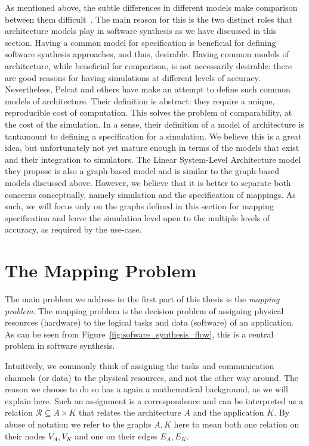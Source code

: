 As mentioned above, the subtle differences in different models make comparison between them difficult~\cite{goens_mcsoc16}.
The main reason for this is the two distinct roles that architecture models play in software synthesis as we have discussed in this section.
Having a common model for specification is beneficial for defining software synthesis approaches, and thus, desirable.
Having common models of architecture, while beneficial for comparison, is not necessarily desirable: there are good reasons for having simulations at different levels of accuracy.
Nevertheless, Pelcat and others have \cite{pelcat2015models} make an attempt to define such common models of architecture.
Their definition is abstract: they require a unique, reproducible cost of computation.
This solves the problem of comparability, at the cost of the simulation.
In a sense, their definition of a model of architecture is tantamount to defining a specification for a simulation.
We believe this is a great idea, but unfortunately not yet mature enough in terms of the models that exist and their integration to simulators.
The Linear System-Level Architecture model they propose is also a graph-based model and is similar to the graph-based models discussed above.
However, we believe that it is better to separate both concerns conceptually, namely simulation and the specification of mappings.
As such, we will focus only on the graphs defined in this section for mapping specification and leave the simulation level open to the multiple levels of accuracy, as required by the use-case.

\section{The Mapping Problem}
\label{sec:mapping_problem}

The main problem we address in the first part of this thesis is the \emph{mapping problem}\cite{marwedel2011mapping}.
The mapping problem is the decision problem of assigning physical resources (hardware) to the logical tasks and data (software) of an application.
As can be seen from Figure~\ref{fig:sofware_synthesis_flow}, this is a central problem in software synthesis.

Intuitively, we commonly think of assigning the tasks and communication channels (or data) to the physical resources, and not the other way around. 
The reason we choose to do so has a again a mathematical background, as we will explain here.
Such an assignment is a correspondence and can be interpreted as a relation $\mathcal{R} \subseteq A \times K$ that relates the architecture $A$ and the application $K$.
By abuse of notation we refer to the graphs $A,K$ here to mean both one relation on their nodes $V_A,V_K$ and one on their edges $E_A,E_K$.

